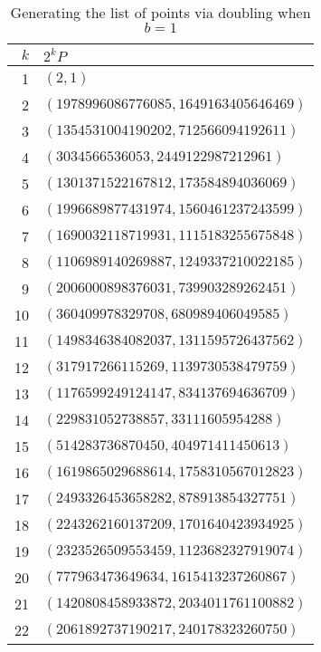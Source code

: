 \begin{table}[htbp]
	\centering
	\begin{tabular}{r|l}
		$k$ & $2^k P$\\
		\hline
		1 & $(2, 1)$\\
		2 & $(1978996086776085, 1649163405646469)$\\
		3 & $(1354531004190202, 712566094192611)$\\
		4 & $(3034566536053, 2449122987212961)$\\
		5 & $(1301371522167812, 173584894036069)$\\
		6 & $(1996689877431974, 1560461237243599)$\\
		7 & $(1690032118719931, 1115183255675848)$\\
		8 & $(1106989140269887, 1249337210022185)$\\
		9 & $(2006000898376031, 739903289262451)$\\
		10 & $(360409978329708, 680989406049585)$\\
		11 & $(1498346384082037, 1311595726437562)$\\
		12 & $(317917266115269, 1139730538479759)$\\
		13 & $(1176599249124147, 834137694636709)$\\
		14 & $(229831052738857, 33111605954288)$\\
		15 & $(514283736870450, 404971411450613)$\\
		16 & $(1619865029688614, 1758310567012823)$\\
		17 & $(2493326453658282, 878913854327751)$\\
		18 & $(2243262160137209, 1701640423934925)$\\
		19 & $(2323526509553459, 1123682327919074)$\\
		20 & $(777963473649634, 1615413237260867)$\\
		21 & $(1420808458933872, 2034011761100882)$\\
		22 & $(2061892737190217, 240178323260750)$
	\end{tabular}
	\label{unsuccessfuldouble}
	\caption{Generating the list of points via doubling when $b=1$}
\end{table}

